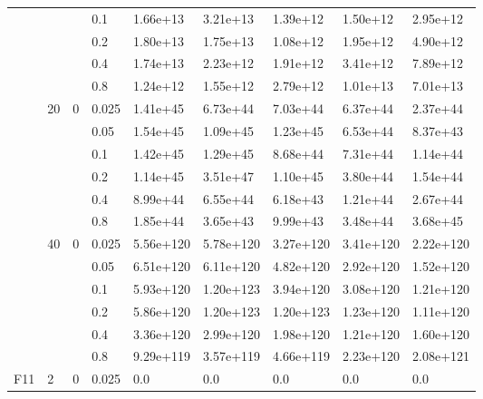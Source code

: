 \begin{longtable}{|l|l|l|l|l|l|l|l|l|}
\cmidrule{4-9} &     &          & 0.1            & 1.66e+13   & 3.21e+13   & 1.39e+12   & 1.50e+12   & 2.95e+12   \\
\cmidrule{4-9} &     &          & 0.2            & 1.80e+13   & 1.75e+13   & 1.08e+12   & 1.95e+12   & 4.90e+12   \\
\cmidrule{4-9} &     &          & 0.4            & 1.74e+13   & 2.23e+12   & 1.91e+12   & 3.41e+12   & 7.89e+12   \\
\cmidrule{4-9} &     &          & 0.8            & 1.24e+12   & 1.55e+12   & 2.79e+12   & 1.01e+13   & 7.01e+13   \\
\cmidrule{2-9} & 20  & 0        & 0.025          & 1.41e+45   & 6.73e+44   & 7.03e+44   & 6.37e+44   & 2.37e+44   \\
\cmidrule{4-9} &     &          & 0.05           & 1.54e+45   & 1.09e+45   & 1.23e+45   & 6.53e+44   & 8.37e+43   \\
\cmidrule{4-9} &     &          & 0.1            & 1.42e+45   & 1.29e+45   & 8.68e+44   & 7.31e+44   & 1.14e+44   \\
\cmidrule{4-9} &     &          & 0.2            & 1.14e+45   & 3.51e+47   & 1.10e+45   & 3.80e+44   & 1.54e+44   \\
\cmidrule{4-9} &     &          & 0.4            & 8.99e+44   & 6.55e+44   & 6.18e+43   & 1.21e+44   & 2.67e+44   \\
\cmidrule{4-9} &     &          & 0.8            & 1.85e+44   & 3.65e+43   & 9.99e+43   & 3.48e+44   & 3.68e+45   \\
\cmidrule{2-9} & 40  & 0        & 0.025          & 5.56e+120  & 5.78e+120  & 3.27e+120  & 3.41e+120  & 2.22e+120  \\
\cmidrule{4-9} &     &          & 0.05           & 6.51e+120  & 6.11e+120  & 4.82e+120  & 2.92e+120  & 1.52e+120  \\
\cmidrule{4-9} &     &          & 0.1            & 5.93e+120  & 1.20e+123  & 3.94e+120  & 3.08e+120  & 1.21e+120  \\
\cmidrule{4-9} &     &          & 0.2            & 5.86e+120  & 1.20e+123  & 1.20e+123  & 1.23e+120  & 1.11e+120  \\
\cmidrule{4-9} &     &          & 0.4            & 3.36e+120  & 2.99e+120  & 1.98e+120  & 1.21e+120  & 1.60e+120  \\
\cmidrule{4-9} &     &          & 0.8            & 9.29e+119  & 3.57e+119  & 4.66e+119  & 2.23e+120  & 2.08e+121  \\ \midrule
F11            & 2   & 0        & 0.025          & 0.0        & 0.0        & 0.0        & 0.0        & 0.0        \\

\end{longtable}
